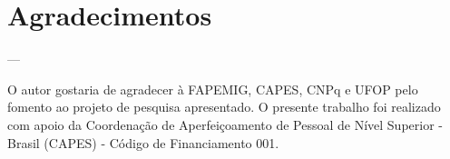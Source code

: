 \chapter*{Agradecimentos}

---

\vspace{1cm}

O autor gostaria de agradecer à FAPEMIG, CAPES, CNPq e UFOP pelo fomento ao projeto 
de pesquisa apresentado. O presente trabalho foi realizado com apoio da Coordenação 
de Aperfeiçoamento de Pessoal de Nível Superior - Brasil (CAPES) - Código de Financiamento 001.


